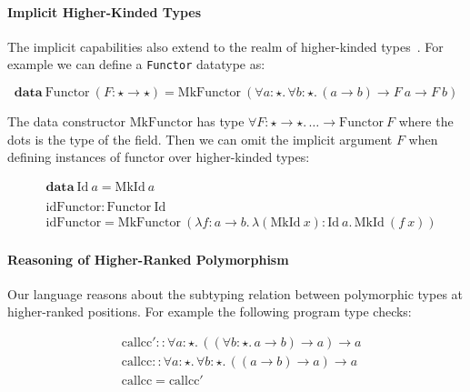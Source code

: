 \paragraph{Implicit Higher-Kinded Types}

The implicit capabilities also extend to the realm of higher-kinded types~\cite{}. For example
we can define a \verb|Functor| datatype as:

\newcommand{\Functor}[0]{\mathrm{Functor}}
\newcommand{\MkFunctor}[0]{\mathrm{MkFunctor}}
\newcommand{\Id}[0]{\mathrm{Id}}
\newcommand{\MkId}[0]{\mathrm{MkId}}

\begin{equation*}
  \mathbf{data}~\Functor~(F : \star \rightarrow \star) = \MkFunctor~(\forall a : \star.\, \forall b : \star.\, (a \rightarrow b) \rightarrow F~a \rightarrow F~b)
\end{equation*}

The data constructor $\MkFunctor$ has type $\forall F : \star \rightarrow \star.\, \dots \rightarrow \Functor~F$ where the dots is the type of the field.
Then we can omit the implicit argument $F$ when defining instances of functor over higher-kinded types:

\begin{align*}
  & \mathbf{data}~\mathrm{Id}~a=\mathrm{MkId}~a \\
  \\
  & \mathrm{idFunctor} : \Functor~\Id \\
  & \mathrm{idFunctor} = \MkFunctor~(\lambda f : a \rightarrow b.\, \lambda (\MkId~x) : \Id~a.\, \MkId~(f~x))
\end{align*}

\paragraph{Reasoning of Higher-Ranked Polymorphism}
\label{sec:higher-ranked-poly}

Our language reasons about the subtyping relation between polymorphic types at
higher-ranked positions. For example the following program type checks:

\begin{align*}
& \mathrm{callcc}' :: \forall a : \star.\, ((\forall b : \star.\, a \rightarrow b) \rightarrow a) \rightarrow a \\
& \mathrm{callcc} :: \forall a : \star.\, \forall b : \star.\, ((a \rightarrow b) \rightarrow a) \rightarrow a \\
& \mathrm{callcc} = \mathrm{callcc}'
\end{align*}

